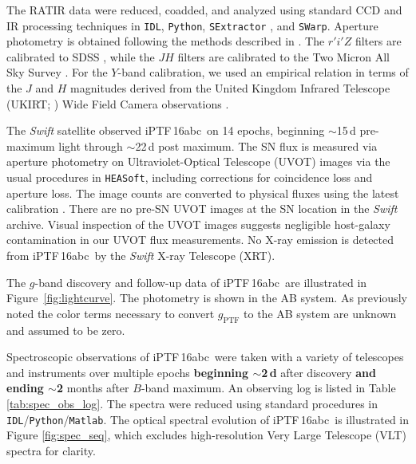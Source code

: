 \documentclass[twocolumn]{aastex61}
\newcommand{\abc}{iPTF\,16abc}
\begin{document}
The RATIR data were reduced, coadded, and analyzed using standard CCD and IR
processing techniques in \texttt{IDL}, \texttt{Python}, \texttt{SExtractor}
\citep{1996A&AS..117..393B}, and \texttt{SWarp}. Aperture photometry is
obtained following the methods described in \citet{2014AJ....148....2L}. The
$r'i'Z$ filters are calibrated to SDSS \citep{2014ApJS..211...17A}, while the
$JH$ filters are calibrated to the Two Micron All Sky Survey
\citep{2006AJ....131.1163S}. For the $Y$-band calibration, we used an
empirical relation in terms of the $J$ and $H$ magnitudes derived from the
United Kingdom Infrared Telescope (UKIRT; \citealt{2007A&A...467..777C}) Wide
Field Camera observations \citep{2009MNRAS.394..675H}.

The \textit{Swift} satellite observed \abc\ on 14 epochs, beginning
$\sim$15\,d pre-maximum light through $\sim$22\,d post maximum. The SN flux is
measured via aperture photometry on Ultraviolet-Optical Telescope (UVOT)
images via the usual procedures in \texttt{HEASoft}, including corrections for
coincidence loss and aperture loss. The image counts are converted to physical
fluxes using the latest calibration \citep{2011AIPC.1358..373B}. There are no
pre-SN UVOT images at the SN location in the \textit{Swift} archive. Visual
inspection of the UVOT images suggests negligible host-galaxy contamination in
our UVOT flux measurements. No X-ray emission is detected from \abc\ by the
\textit{Swift} X-ray Telescope (XRT).

The $g$-band discovery and follow-up data of \abc\ are illustrated in
Figure~\ref{fig:lightcurve}. The photometry is shown in the AB system. As
previously noted the color terms necessary to convert $g_\mathrm{PTF}$ to the
AB system are unknown and assumed to be zero.

Spectroscopic observations of \abc\ were taken with a variety of telescopes
and instruments over multiple epochs \textbf{beginning $\sim$2\,d} after
discovery \textbf{and ending $\sim$2} months after $B$-band maximum. An
observing log is listed in Table \ref{tab:spec_obs_log}. The spectra were
reduced using standard procedures in
\texttt{IDL}/\texttt{Python}/\texttt{Matlab}. The optical spectral evolution
of \abc\ is illustrated in Figure \ref{fig:spec_seq}, which excludes
high-resolution Very Large Telescope (VLT) spectra for clarity.
\end{document}

